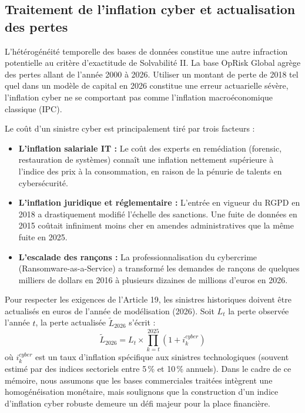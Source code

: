 \documentclass[11pt,a4paper]{article}
\theoremstyle{navystyle}
\theoremstyle{navydef}
\begin{document}
\subsection{Traitement de l'inflation cyber et actualisation des pertes}

L'hétérogénéité temporelle des bases de données constitue une autre infraction potentielle au critère d'exactitude de Solvabilité II. La base OpRisk Global agrège des pertes allant de l'année 2000 à 2026. Utiliser un montant de perte de 2018 tel quel dans un modèle de capital en 2026 constitue une erreur actuarielle sévère, l'inflation cyber ne se comportant pas comme l'inflation macroéconomique classique (IPC).

Le coût d'un sinistre cyber est principalement tiré par trois facteurs :
\begin{itemize}
    \item \textbf{L'inflation salariale IT :} Le coût des experts en remédiation (forensic, restauration de systèmes) connaît une inflation nettement supérieure à l'indice des prix à la consommation, en raison de la pénurie de talents en cybersécurité.
    \item \textbf{L'inflation juridique et réglementaire :} L'entrée en vigueur du RGPD en 2018 a drastiquement modifié l'échelle des sanctions. Une fuite de données en 2015 coûtait infiniment moins cher en amendes administratives que la même fuite en 2025.
    \item \textbf{L'escalade des rançons :} La professionnalisation du cybercrime (Ransomware-as-a-Service) a transformé les demandes de rançons de quelques milliers de dollars en 2016 à plusieurs dizaines de millions d'euros en 2026.
\end{itemize}

Pour respecter les exigences de l'Article 19, les sinistres historiques doivent être actualisés en euros de l'année de modélisation (2026). Soit $L_t$ la perte observée l'année $t$, la perte actualisée $\tilde{L}_{2026}$ s'écrit :
\begin{equation}
\tilde{L}_{2026} = L_t \times \prod_{k=t}^{2025} (1 + i_k^{cyber})
\end{equation}
où $i_k^{cyber}$ est un taux d'inflation spécifique aux sinistres technologiques (souvent estimé par des indices sectoriels entre 5\,\% et 10\,\% annuels). Dans le cadre de ce mémoire, nous assumons que les bases commerciales traitées intègrent une homogénéisation monétaire, mais soulignons que la construction d'un indice d'inflation cyber robuste demeure un défi majeur pour la place financière.
\end{document}
